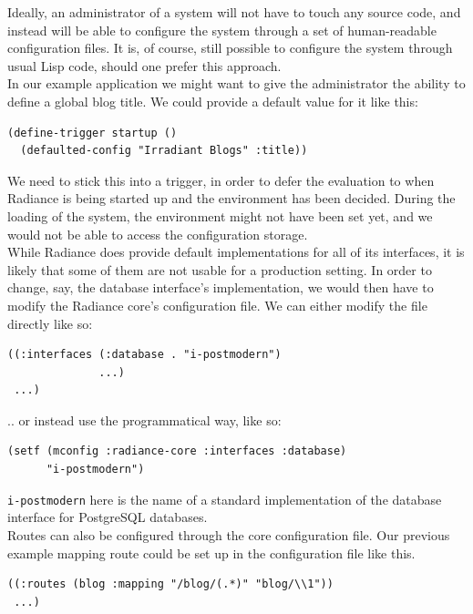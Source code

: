 \documentclass{sig-alternate}
\begin{document}
Ideally, an administrator of a system will not have to touch any source code, and instead will be able to configure the system through a set of human-readable configuration files. It is, of course, still possible to configure the system through usual Lisp code, should one prefer this approach. \\

In our example application we might want to give the administrator the ability to define a global blog title. We could provide a default value for it like this:

\begin{verbatim}
(define-trigger startup ()
  (defaulted-config "Irradiant Blogs" :title))
\end{verbatim}

We need to stick this into a trigger, in order to defer the evaluation to when Radiance is being started up and the environment has been decided. During the loading of the system, the environment might not have been set yet, and we would not be able to access the configuration storage. \\

While Radiance does provide default implementations for all of its interfaces, it is likely that some of them are not usable for a production setting. In order to change, say, the database interface's implementation, we would then have to modify the Radiance core's configuration file. We can either modify the file directly like so:

\begin{verbatim}
((:interfaces (:database . "i-postmodern")
              ...)
 ...)
\end{verbatim}

.. or instead use the programmatical way, like so:

\begin{verbatim}
(setf (mconfig :radiance-core :interfaces :database)
      "i-postmodern")
\end{verbatim}

\texttt{i-postmodern} here is the name of a standard implementation of the database interface for PostgreSQL databases. \\

Routes can also be configured through the core configuration file. Our previous example mapping route could be set up in the configuration file like this.

\begin{verbatim}
((:routes (blog :mapping "/blog/(.*)" "blog/\\1"))
 ...)
\end{verbatim}
\end{document}
